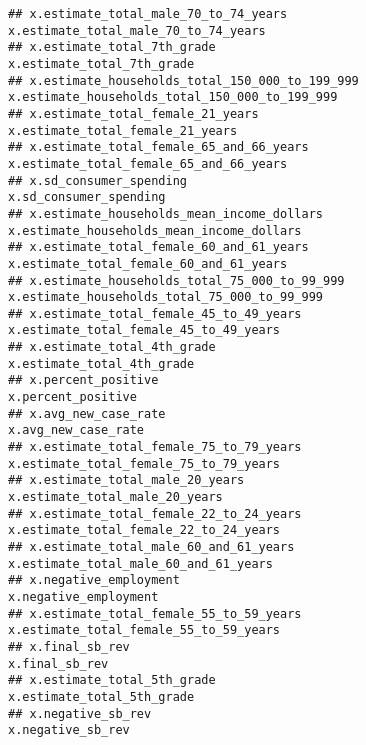 \documentclass[
]{article}
\begin{document}
\begin{verbatim}
## x.estimate_total_male_70_to_74_years                                               x.estimate_total_male_70_to_74_years
## x.estimate_total_7th_grade                                                                   x.estimate_total_7th_grade
## x.estimate_households_total_150_000_to_199_999                           x.estimate_households_total_150_000_to_199_999
## x.estimate_total_female_21_years                                                       x.estimate_total_female_21_years
## x.estimate_total_female_65_and_66_years                                         x.estimate_total_female_65_and_66_years
## x.sd_consumer_spending                                                                           x.sd_consumer_spending
## x.estimate_households_mean_income_dollars                                     x.estimate_households_mean_income_dollars
## x.estimate_total_female_60_and_61_years                                         x.estimate_total_female_60_and_61_years
## x.estimate_households_total_75_000_to_99_999                               x.estimate_households_total_75_000_to_99_999
## x.estimate_total_female_45_to_49_years                                           x.estimate_total_female_45_to_49_years
## x.estimate_total_4th_grade                                                                   x.estimate_total_4th_grade
## x.percent_positive                                                                                   x.percent_positive
## x.avg_new_case_rate                                                                                 x.avg_new_case_rate
## x.estimate_total_female_75_to_79_years                                           x.estimate_total_female_75_to_79_years
## x.estimate_total_male_20_years                                                           x.estimate_total_male_20_years
## x.estimate_total_female_22_to_24_years                                           x.estimate_total_female_22_to_24_years
## x.estimate_total_male_60_and_61_years                                             x.estimate_total_male_60_and_61_years
## x.negative_employment                                                                             x.negative_employment
## x.estimate_total_female_55_to_59_years                                           x.estimate_total_female_55_to_59_years
## x.final_sb_rev                                                                                           x.final_sb_rev
## x.estimate_total_5th_grade                                                                   x.estimate_total_5th_grade
## x.negative_sb_rev                                                                                     x.negative_sb_rev

\end{verbatim}
\end{document}
